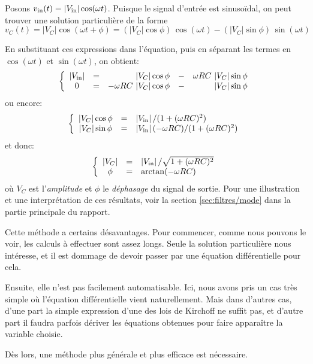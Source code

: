 Posons $v_{\mathrm{in}}(t) = |V_{\mathrm{in}}|\cos(\omega t)$.
Puisque le signal d'entrée est sinusoïdal, on peut trouver une solution
particulière de la forme
\[
    v_C(t) = |V_C|\cos(\omega t + \phi)
    = (|V_C|\cos\phi)\,\cos(\omega t) - (|V_C|\sin\phi)\,\sin(\omega t)
\]

En substituant ces expressions dans l'équation,
puis en séparant les termes en $\cos(\omega t)$ et $\sin(\omega t)$,
on obtient:
\begin{equation}
    \left\{
        \begin{array}{ccrcr}
            |V\ind{in}| &=& |V_C|\cos\phi &-& \omega RC\ |V_C|\sin\phi \\
            0 &=& -\omega RC\ |V_C|\cos\phi &-& |V_C|\sin\phi
        \end{array}
    \right.
\end{equation}
ou encore:
\begin{equation}
    \left\{
        \begin{array}{ccl}
            |V_C|\cos\phi &=& |V_{\mathrm{in}}|\,/(1+(\omega RC)^2) \\
            |V_C|\sin\phi &=& |V_{\mathrm{in}}|\,(-\omega RC) / (1+(\omega RC)^2)
        \end{array}
    \right.
\end{equation}
et donc:
\begin{equation}
    \left\{
        \begin{array}{ccl}
            |V_C| &=& |V_{\mathrm{in}}|\,/ \sqrt{1+(\omega RC)^2} \\
            \phi &=& \arctan(-\omega RC)
        \end{array}
    \right.
\end{equation}
où $V_C$ est l'\emph{amplitude} et $\phi$ le \emph{déphasage}
du signal de sortie.
Pour une illustration et une interprétation de ces résultats,
voir la section \ref{sec:filtres/mode} dans la partie principale du rapport.

Cette méthode a certains désavantages.
Pour commencer, comme nous pouvons le voir, les calculs à effectuer
sont assez longs.
Seule la solution particulière nous intéresse,
et il est dommage de devoir passer par une équation différentielle pour cela.

Ensuite, elle n'est pas facilement automatisable.
Ici, nous avons pris un cas très simple où l'équation différentielle
vient naturellement.
Mais dans d'autres cas,
d'une part la simple expression d'une
des lois de Kirchoff ne suffit pas,
et d'autre part il faudra parfois dériver les équations
obtenues pour faire apparaître la variable choisie.

Dès lors, une méthode plus générale et plus efficace est nécessaire.
